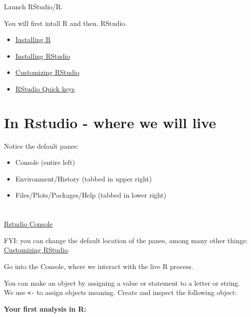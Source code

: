 \documentclass[
]{book}
\providecommand{\tightlist}{%
  \setlength{\itemsep}{0pt}\setlength{\parskip}{0pt}}
\begin{document}
Launch RStudio/R.

You will first intall R and then. RStudio.

\begin{itemize}
\item
  \href{https://cran.case.edu/}{Installing R}
\item
  \href{https://www.rstudio.com/products/rstudio/download/}{Installing RStudio}
\item
  \href{https://support.rstudio.com/hc/en-us/articles/200549016-Customizing-the-RStudio-IDE}{Customizing RStudio}
\item
  \href{https://support.rstudio.com/hc/en-us/articles/200711853-Keyboard-Shortcuts-in-the-RStudio-IDE}{RStudio Quick keys}
\end{itemize}

\hypertarget{in-rstudio---where-we-will-live}{%
\section{In Rstudio - where we will live}\label{in-rstudio---where-we-will-live}}

Notice the default panes:

\begin{itemize}
\tightlist
\item
  Console (entire left)
\item
  Environment/History (tabbed in upper right)
\item
  Files/Plots/Packages/Help (tabbed in lower right)
\end{itemize}

\hypertarget{section}{%
\section{}\label{section}}

\href{http://www.sthda.com/sthda/RDoc/images/rstudio.png}{Rstudio Console}

FYI: you can change the default location of the panes, among many other things: \href{https://support.rstudio.com/hc/en-us/articles/200549016-Customizing-the-RStudio-IDE}{Customizing RStudio}.

Go into the Console, where we interact with the live R process.

You can make an object by assigning a value or statement to a letter or string. We use \texttt{\textless{}-} to assign objects meaning. Create and inspect the following object:

\textbf{Your first analysis in R:}
\end{document}
